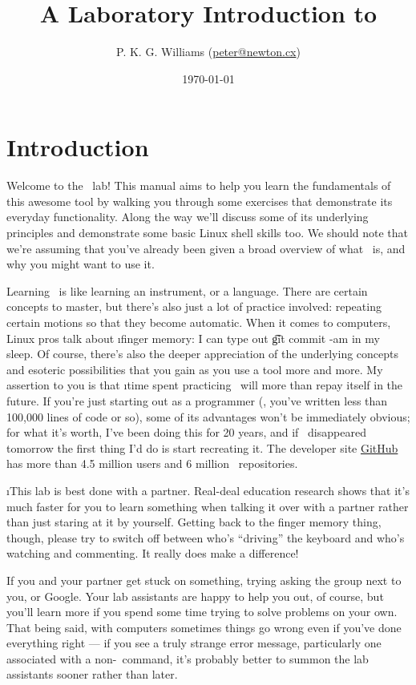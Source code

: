 \documentclass[letterpaper,12pt,titlepage]{article}
\title{A Laboratory Introduction to \git}
\author{P. K. G. Williams (\href{mailto:peter@newton.cx}{peter@newton.cx})}
\date{\today}
\begin{document}
\maketitle

\section*{Introduction}

Welcome to the \git\ lab! This manual aims to help you learn the fundamentals
of this awesome tool by walking you through some exercises that demonstrate
its everyday functionality. Along the way we'll discuss some of its underlying
principles and demonstrate some basic Linux shell skills too. We should note
that we're assuming that you've already been given a broad overview of what
\git\ is, and why you might want to use it.

Learning \git\ is like learning an instrument, or a language. There are
certain concepts to master, but there's also just a lot of practice involved:
repeating certain motions so that they become automatic. When it comes to
computers, Linux pros talk about \i{finger memory}: I can type out \t{git
  commit -am} in my sleep. Of course, there's also the deeper appreciation of
the underlying concepts and esoteric possibilities that you gain as you use a
tool more and more. My assertion to you is that \i{time spent practicing
  \git\ will more than repay itself in the future}. If you're just starting
out as a programmer (\ie, you've written less than 100,000 lines of code or
so), some of its advantages won't be immediately obvious; for what it's worth,
I've been doing this for 20 years, and if \git\ disappeared tomorrow the first
thing I'd do is start recreating it. The developer site
\href{https://github.com/}{GitHub} has more than 4.5 million users and 6
million \git\ repositories.

\i{This lab is best done with a partner.} Real-deal education research shows
that it's much faster for you to learn something when talking it over with a
partner rather than just staring at it by yourself. Getting back to the finger
memory thing, though, please try to switch off between who's ``driving'' the
keyboard and who's watching and commenting. It really does make a difference!

If you and your partner get stuck on something, trying asking the group next
to you, or Google. Your lab assistants are happy to help you out, of course,
but you'll learn more if you spend some time trying to solve problems on your
own. That being said, with computers sometimes things go wrong even if you've
done everything right --- if you see a truly strange error message,
particularly one associated with a non-\git\ command, it's probably better to
summon the lab assistants sooner rather than later.
\end{document}
